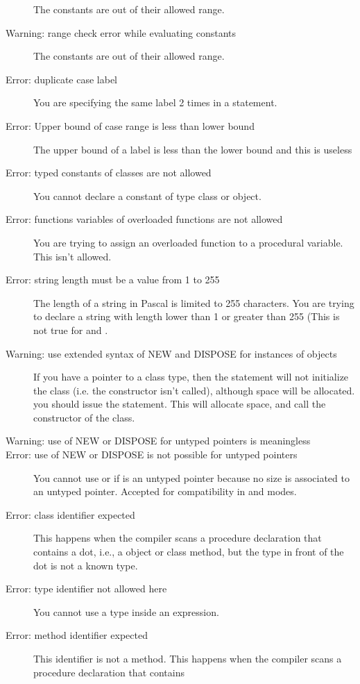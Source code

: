 \begin{description}
 The constants are out of their allowed range.
\item [Warning: range check error while evaluating constants]
 The constants are out of their allowed range.
\item [Error: duplicate case label]
 You are specifying the same label 2 times in a  statement.
\item [Error: Upper bound of case range is less than lower bound]
 The upper bound of a  label is less than the lower bound and this
 is useless
\item [Error: typed constants of classes are not allowed]
 You cannot declare a constant of type class or object.
\item [Error: functions variables of overloaded functions are not allowed]
 You are trying to assign an overloaded function to a procedural variable.
 This isn't allowed.
\item [Error: string length must be a value from 1 to 255]
 The length of a string in Pascal is limited to 255 characters. You are
 trying to declare a string with length lower than 1 or greater than 255
 (This is not true for  and .
\item [Warning: use extended syntax of NEW and DISPOSE for instances of objects]
 If you have a pointer  to a class type, then the statement
  will not initialize the class (i.e. the constructor isn't
 called), although space will be allocated. you should issue the
  statement. This will allocate space, and call the
 constructor of the class.
\item [Warning: use of NEW or DISPOSE for untyped pointers is meaningless]
\item [Error: use of NEW or DISPOSE is not possible for untyped pointers]
 You cannot use  or  if  is an untyped pointer
 because no size is associated to an untyped pointer.
 Accepted for compatibility in  and  modes.
\item [Error: class identifier expected]
 This happens when the compiler scans a procedure declaration that contains
 a dot,
 i.e., a object or class method, but the type in front of the dot is not
 a known type.
\item [Error: type identifier not allowed here]
 You cannot use a type inside an expression.
\item [Error: method identifier expected]
 This identifier is not a method.
 This happens when the compiler scans a procedure declaration that contains

\end{description}
